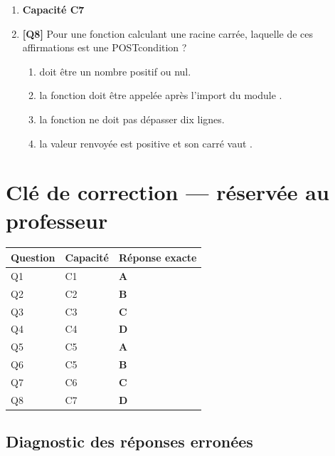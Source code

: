 \begin{enumerate}
\item[] \textbf{Capacité C7}

\item \textbf{[Q8]} Pour une fonction  calculant une racine carrée, laquelle de ces affirmations est une POSTcondition ?
  \begin{enumerate}[label=\Alph*.]
    \item {} doit être un nombre positif ou nul.
    \item la fonction doit être appelée après l'import du module .
    \item la fonction ne doit pas dépasser dix lignes.
    \item la valeur renvoyée est positive et son carré vaut .
  \end{enumerate}

\end{enumerate}

\ifnxVersionProfesseur
\clearpage
\section*{Clé de correction — réservée au professeur}

\begin{center}
\begin{tabular}{lll}
\hline
Question & Capacité & Réponse exacte \\
\hline
Q1 & C1 & \textbf{A} \\
Q2 & C2 & \textbf{B} \\
Q3 & C3 & \textbf{C} \\
Q4 & C4 & \textbf{D} \\
Q5 & C5 & \textbf{A} \\
Q6 & C5 & \textbf{B} \\
Q7 & C6 & \textbf{C} \\
Q8 & C7 & \textbf{D} \\
\hline
\end{tabular}
\end{center}

\subsection*{Diagnostic des réponses erronées}

